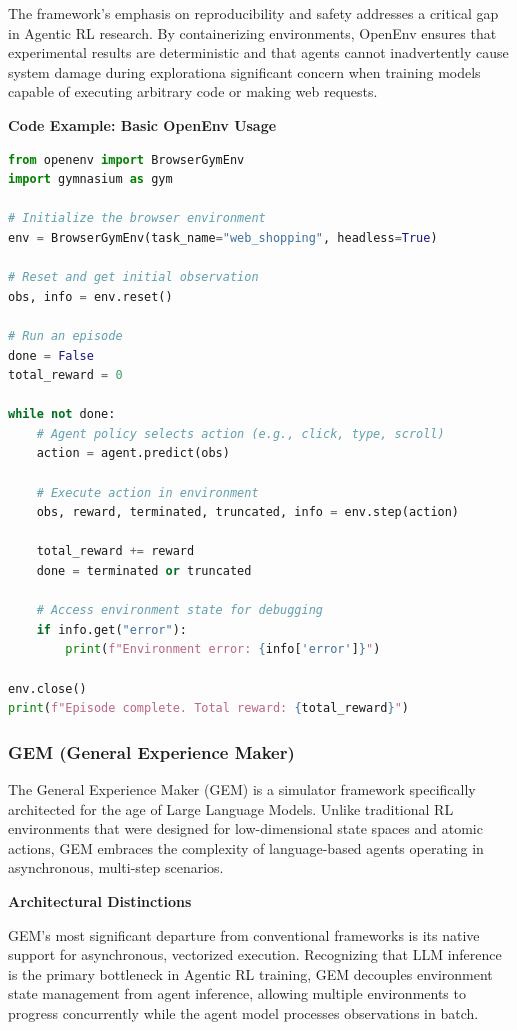 The framework's emphasis on reproducibility and safety addresses a critical gap in Agentic RL research. By containerizing environments, OpenEnv ensures that experimental results are deterministic and that agents cannot inadvertently cause system damage during explorationa significant concern when training models capable of executing arbitrary code or making web requests.

\textbf{Code Example: Basic OpenEnv Usage}

\begin{lstlisting}[language=Python]
from openenv import BrowserGymEnv
import gymnasium as gym

# Initialize the browser environment
env = BrowserGymEnv(task_name="web_shopping", headless=True)

# Reset and get initial observation
obs, info = env.reset()

# Run an episode
done = False
total_reward = 0

while not done:
    # Agent policy selects action (e.g., click, type, scroll)
    action = agent.predict(obs)
    
    # Execute action in environment
    obs, reward, terminated, truncated, info = env.step(action)
    
    total_reward += reward
    done = terminated or truncated
    
    # Access environment state for debugging
    if info.get("error"):
        print(f"Environment error: {info['error']}")

env.close()
print(f"Episode complete. Total reward: {total_reward}")
\end{lstlisting}

\subsubsection{GEM (General Experience Maker)}

The General Experience Maker (GEM) is a simulator framework specifically architected for the age of Large Language Models. Unlike traditional RL environments that were designed for low-dimensional state spaces and atomic actions, GEM embraces the complexity of language-based agents operating in asynchronous, multi-step scenarios.

\textbf{Architectural Distinctions}

GEM's most significant departure from conventional frameworks is its native support for asynchronous, vectorized execution. Recognizing that LLM inference is the primary bottleneck in Agentic RL training, GEM decouples environment state management from agent inference, allowing multiple environments to progress concurrently while the agent model processes observations in batch.

